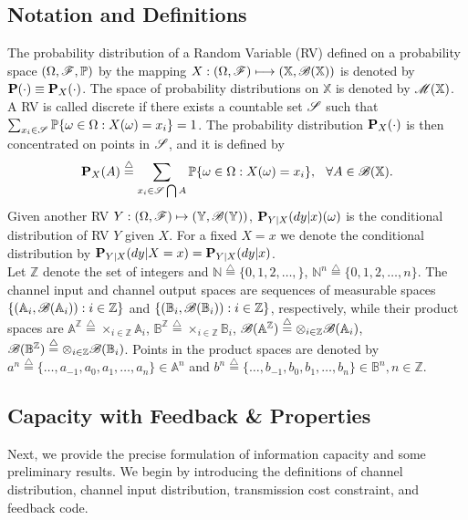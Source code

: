 \documentclass[11pt, a4paper, journal,onecolumn]{IEEEtran}
\newcommand{\mb}{\mathbb}
\newcommand{\sr}{\stackrel}
\newcommand{\tri}{\sr{\triangle}{=}}
\newcommand{\bea}{\begin{eqnarray}}
\newcommand{\eea}{\end{eqnarray}}
\newcommand{\hso}{\hspace{.1in}}
\begin{document}
\subsection{Notation and Definitions}
The probability distribution of a Random Variable (RV)  defined on a probability space $(\Omega, {\cal F}, {\mathbb P})$ by the mapping $X: (\Omega, {\cal F}) \longmapsto ({\mb X}, {\cal  B}({\mb X}))$  is denoted by $ {\bf P}(\cdot) \equiv {\bf P}_X(\cdot)$. 
The space of probability distributions on $\mathbb X$ is denoted by ${\cal M(\mathbb X)}$.  A RV is called discrete if there exists a countable set ${\cal S}$ such that $\sum_{x_i \in {\cal S}} {\mathbb  P} \{ \omega \in \Omega : X(\omega)=x_i\}=1$. The probability distribution ${\bf P}_X(\cdot)$  is then concentrated on  points in ${\cal S}$, and it is defined by 
\bea
 {\bf P}_X(A)  \tri \sum_{x_i \in {\cal S} \bigcap A} {\mathbb P} \{ \omega \in \Omega : X(\omega)=x_i\}, \hso \forall A \in {\cal  B}({\mb X}). 
\eea 
Given another RV $Y:(\Omega, {\cal F})\mapsto ({\mathbb Y},{\cal  B}({\mb Y}))$, ${\bf P}_{Y|X}(dy|x)(\omega)$ is the conditional distribution of RV $Y$ given $X$. For a fixed $X=x$ we denote the conditional distribution by ${\bf P}_{Y|X}(dy|X=x)={\bf P}_{Y|X}(dy|x)$. \\
Let $\mathbb{Z}$ denote the set of integers and  ${\mathbb{N}}\tri\{0, 1,2,\dots,\}$, ${\mathbb{N}^n}\tri\{0, 1,2,\dots,n\}$. The channel input and channel output spaces are sequences of measurable spaces $\{({\mathbb A}_i,{\cal B}({\mathbb A}_i)): i \in {\mathbb Z}\}$ and $\{({\mathbb B}_i,{\cal B}({\mathbb B}_i)): i \in {\mathbb Z}\}$, respectively, while their product spaces are ${\mathbb A}^{\mathbb Z}\tri \times_{i \in \mathbb Z} {\mathbb A}_i$, ${\mathbb B}^{\mathbb Z}\tri \times_{i \in \mathbb Z} {\mathbb B}_i$,  ${\cal B}({\mathbb A}^{\mathbb Z}) \tri \otimes_{i \in \mathbb Z} {\cal B}({\mathbb A}_i)$, ${\cal B}({\mathbb B}^{\mathbb Z})\tri \otimes_{i \in \mathbb Z} {\cal B}({\mathbb B}_i)$. Points in the product spaces are denoted by $a^n \tri \{\ldots, a_{-1}, a_0, a_1, \ldots, a_n\}\in {\mb A}^n$ and $b^n \tri \{\ldots, b_{-1}, b_0, b_1, \ldots, b_n\}\in {\mb B}^n, n \in {\mathbb Z}$. 


\subsection{Capacity with Feedback \& Properties}\label{ssec:b_feed}
Next, we provide the precise formulation of information capacity and some preliminary results. We begin by introducing the definitions of channel distribution, channel input distribution, transmission cost constraint, and feedback code.\\
\end{document}
